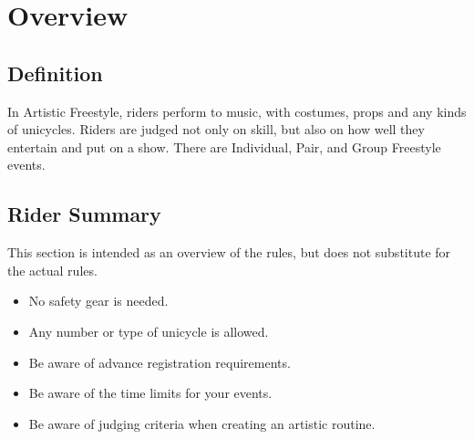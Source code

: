 \chapter{Overview}

\section{Definition}

In Artistic Freestyle, riders perform to music, with costumes, props and any kinds of unicycles.
Riders are judged not only on skill, but also on how well they entertain and put on a show.
There are Individual, Pair, and Group Freestyle events.

\section{Rider Summary}

This section is intended as an overview of the rules, but does not
substitute for the actual rules.
\begin{itemize}
    \item No safety gear is needed.
    \item Any number or type of unicycle is allowed.
    \item Be aware of advance registration requirements.
    \item Be aware of the time limits for your events.
    \item Be aware of judging criteria when creating an artistic routine.
\end{itemize}
